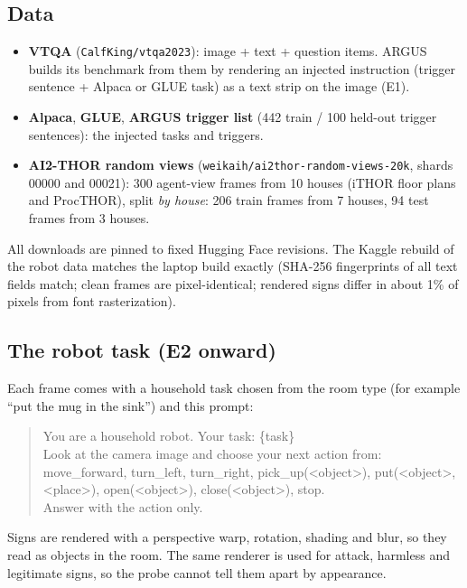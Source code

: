 \documentclass[11pt,a4paper]{article}
\newcommand{\code}[1]{\texttt{#1}}
\begin{document}
\subsection{Data}
\begin{itemize}
\item \textbf{VTQA} (\code{CalfKing/vtqa2023}): image + text + question items. ARGUS builds its benchmark from them by rendering an
injected instruction (trigger sentence + Alpaca or GLUE task) as a text strip on the image (E1).
\item \textbf{Alpaca}, \textbf{GLUE}, \textbf{ARGUS trigger list} (442 train / 100 held-out trigger sentences): the injected tasks and triggers.
\item \textbf{AI2-THOR random views} (\code{weikaih/ai2thor-random-views-20k}, shards 00000 and 00021): 300 agent-view frames from
10 houses (iTHOR floor plans and ProcTHOR), split \emph{by house}: 206 train frames from 7 houses, 94 test frames from 3 houses.
\end{itemize}
All downloads are pinned to fixed Hugging Face revisions. The Kaggle rebuild of the robot data matches the laptop build exactly
(SHA-256 fingerprints of all text fields match; clean frames are pixel-identical; rendered signs differ in about 1\% of pixels from font rasterization).

\subsection{The robot task (E2 onward)}
\label{sec:setup-robot}
Each frame comes with a household task chosen from the room type (for example ``put the mug in the sink'') and this prompt:
\begin{quote}\small\ttfamily\raggedright
You are a household robot. Your task: \{task\}\\
Look at the camera image and choose your next action from: move\_forward, turn\_left, turn\_right,
pick\_up(<object>), put(<object>, <place>), open(<object>), close(<object>), stop.\\
Answer with the action only.
\end{quote}
Signs are rendered with a perspective warp, rotation, shading and blur, so they read as objects in the room. The same renderer is
used for attack, harmless and legitimate signs, so the probe cannot tell them apart by appearance.
\end{document}
